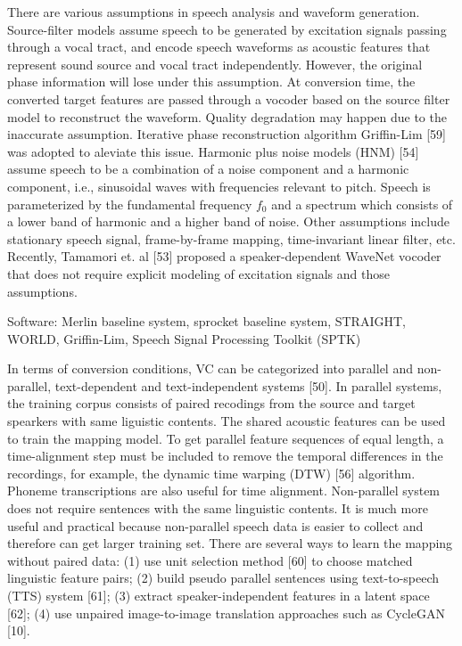 \documentclass{article}
\begin{document}
There are various assumptions in speech analysis and waveform generation. Source-filter models assume speech to be generated by excitation signals passing through a vocal tract, and encode speech waveforms as acoustic features that represent sound source and vocal tract independently. However, the original phase information will lose under this assumption. At conversion time, the converted target features are passed through a vocoder based on the source filter model to reconstruct the waveform. Quality degradation may happen due to the inaccurate assumption. Iterative phase reconstruction algorithm Griffin-Lim [59] was adopted to aleviate this issue. Harmonic plus noise models (HNM) [54] assume speech to be a combination of a noise component and a harmonic component, i.e., sinusoidal waves with frequencies relevant to pitch. Speech is parameterized by the fundamental frequency $f_0$ and a spectrum which consists of a lower band of harmonic and a higher band of noise. Other assumptions include
stationary speech signal, %
frame-by-frame mapping, %
time-invariant linear filter, etc. Recently, Tamamori et. al [53] proposed a speaker-dependent WaveNet vocoder that does not require explicit modeling of excitation signals and those assumptions. 

{\color{blue} Software: Merlin baseline system, sprocket baseline system, STRAIGHT, WORLD, Griffin-Lim, Speech Signal Processing Toolkit (SPTK)}

In terms of conversion conditions, VC can be categorized into parallel and non-parallel, text-dependent and text-independent systems [50]. In parallel systems, the training corpus consists of paired recodings from the source and target spearkers with same liguistic contents. The shared acoustic features can be used to train the mapping model. To get parallel feature sequences of equal length, a time-alignment step must be included to remove the temporal differences in the recordings, for example, the dynamic time warping (DTW) [56] algorithm. Phoneme transcriptions are also useful for time alignment. Non-parallel system does not require sentences with the same linguistic contents. It is much more useful and practical because non-parallel speech data is easier to collect and therefore can get larger training set. There are several ways to learn the mapping without paired data: (1) use unit selection method [60] to choose matched linguistic feature pairs; (2) build pseudo parallel sentences using text-to-speech (TTS) system [61]; (3) extract speaker-independent features in a latent space [62]; (4) use unpaired image-to-image translation approaches such as CycleGAN [10]. 
\end{document}
